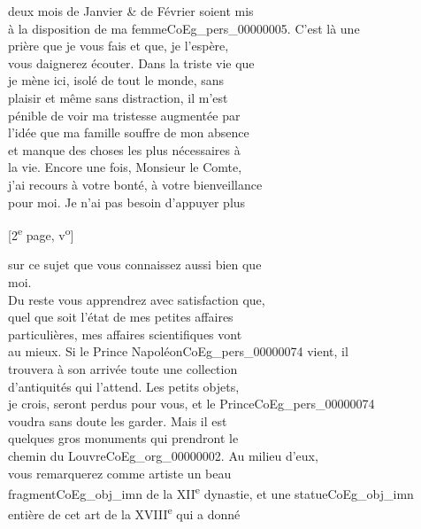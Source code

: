 \documentclass{book}
\begin{document}
deux mois de Janvier \& de Février soient mis\\
à la disposition de ma femme\gls{CoEg_pers_00000005}. C’est là une\\
prière que je vous fais et que, je l’espère,\\
vous daignerez écouter. Dans la triste vie que\\
je mène ici, isolé de tout le monde, sans\\
plaisir et même sans distraction, il m’est\\
pénible de voir ma tristesse augmentée par\\
l’idée que ma famille souffre de mon absence\\
et manque des choses les plus nécessaires à\\
la vie. Encore une fois, Monsieur le Comte,\\
j’ai recours à votre bonté, à votre bienveillance\\
pour moi. Je n’ai pas besoin d’appuyer plus
{\footnotesize \begin{center} [2\textsuperscript{e} page, v\textsuperscript{o}]\end{center}}
\noindent sur ce sujet que vous connaissez aussi bien que\\
moi.\\
\indent Du reste vous apprendrez avec satisfaction que,\\
quel que soit l’état de mes petites affaires\\
particulières, mes affaires scientifiques vont\\
au mieux. Si le Prince Napoléon\gls{CoEg_pers_00000074} vient, il\\
trouvera à son arrivée toute une collection\\
d’antiquités qui l’attend. Les petits objets,\\
je crois, seront perdus pour vous, et le Prince\gls{CoEg_pers_00000074}\\
voudra sans doute les garder. Mais il est\\
quelques gros monuments qui prendront le\\
chemin du Louvre\gls{CoEg_org_00000002}. Au milieu d’eux,\\
vous remarquerez comme artiste un beau\\
fragment\gls{CoEg_obj_imn} de la XII\textsuperscript{e} dynastie, et une statue\gls{CoEg_obj_imn}\\
entière de cet art de la XVIII\textsuperscript{e} qui a donné\\
\end{document}
